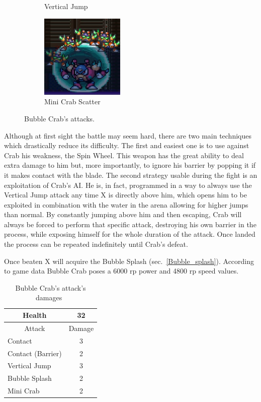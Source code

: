 \begin{figure}[htp]
\begin{subfigure}{0.40\linewidth}
		\caption{Vertical Jump}
	\end{subfigure}
	\begin{subfigure}{0.40\linewidth}
		\centering
		\includegraphics[height=4cm]{figures/X2/Bubble_crab/Crab_DM.png}
		\caption{Mini Crab Scatter}
	\end{subfigure}
	\caption{Bubble Crab's attacks.}	
\end{figure}
Although at first sight the battle may seem hard, there are two main techniques which drastically reduce its difficulty. The first and easiest one is to use against Crab his weakness, the Spin Wheel. This weapon has the great ability to deal extra damage to him but, more importantly, to ignore his barrier by popping it if it makes contact with the blade. The second strategy usable during the fight is an exploitation of Crab's AI. He is, in fact, programmed in a way to always use the Vertical Jump attack any time X is directly above him, which opens him to be exploited in combination with the water in the arena allowing for higher jumps than normal. By constantly jumping above him and then escaping, Crab will always be forced to perform that specific attack, destroying his own barrier in the process, while exposing himself for the whole duration of the attack. Once landed the process can be repeated indefinitely until Crab's defeat.

Once beaten X will acquire the Bubble Splash (sec.~\ref{Bubble_splash}). According to game data Bubble Crab poses a 6000 rp power and 4800 rp speed values.

\begin{table}[htp]
	\centering
	\begin{tabular}[h]{l c}
		\toprule
		\multicolumn{1}{c}{Health}  & 32 \\
		\midrule
		\multicolumn{1}{c}{Attack} & \multicolumn{1}{c}{Damage}\\
		Contact & 3 \\
		Contact (Barrier) & 2\\
		Vertical Jump& 3\\
		Bubble Splash & 2\\
		Mini Crab & 2\\
		\bottomrule
	\end{tabular}
	\caption{Bubble Crab's attack's damages~\cite{wiki:Bubble_Crab}}
\end{table}

